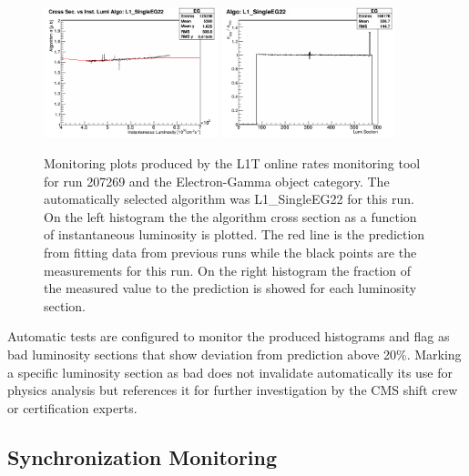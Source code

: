 \begin{figure}[!htb]
\centering
\includegraphics[width=0.45\textwidth]{Chapter03/L1TOnline/Images/L1TDQM_Online_Run207269_L1TRate_TriggerCrossSections_EG.png}
\includegraphics[width=0.45\textwidth]{Chapter03/L1TOnline/Images/L1TDQM_Online_Run207269_L1TRate_Certification_EG.png}
\caption{Monitoring plots produced by the \gls{L1T} online rates monitoring tool for run 207269 and the Electron-Gamma object category. The automatically selected algorithm was L1\_SingleEG22 for this run. On the left histogram the the algorithm cross section as a function of instantaneous luminosity is plotted. The red line is the prediction from fitting data from previous runs while the black points are the measurements for this run. On the right histogram the fraction of the measured value to the prediction is showed for each luminosity section.}
\label{FIGURE:TechnicalWork_RateMonitoring}
\end{figure}

Automatic tests are configured to monitor the produced histograms and flag as bad luminosity sections that show deviation from prediction above 20\%. Marking a specific luminosity section as bad does not invalidate automatically its use for physics analysis but references it for further investigation by the \gls{CMS} shift crew or certification experts.

\subsection{Synchronization Monitoring}
\label{SECTION:TechnicalWork_L1TDQM_SynchronizationMonitoring}

